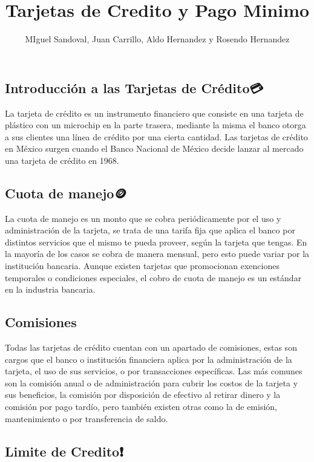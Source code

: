 \documentclass[
  letterpaper,
  DIV=11,
  numbers=noendperiod]{scrartcl}
\title{Tarjetas de Credito y Pago Minimo}
\author{MIguel Sandoval, Juan Carrillo, Aldo Hernandez y Rosendo
Hernandez}
\date{}
\begin{document}
\maketitle


\subsection{Introducción a las Tarjetas de
Crédito💳}\label{introducciuxf3n-a-las-tarjetas-de-cruxe9dito}

La tarjeta de crédito es un instrumento financiero que consiste en una
tarjeta de plástico con un microchip en la parte trasera, mediante la
misma el banco otorga a sus clientes una línea de crédito por una cierta
cantidad. Las tarjetas de crédito en México surgen cuando el Banco
Nacional de México decide lanzar al mercado una tarjeta de crédito en
1968.

\subsection{Cuota de manejo🪙}\label{cuota-de-manejo}

La cuota de manejo es un monto que se cobra periódicamente por el uso y
administración de la tarjeta, se trata de una tarifa fija que aplica el
banco por distintos servicios que el mismo te pueda proveer, según la
tarjeta que tengas. En la mayoría de los casos se cobra de manera
mensual, pero esto puede variar por la institución bancaria. Aunque
existen tarjetas que promocionan exenciones temporales o condiciones
especiales, el cobro de cuota de manejo es un estándar en la industria
bancaria.

\subsection{Comisiones🧾}\label{comisiones}

Todas las tarjetas de crédito cuentan con un apartado de comisiones,
estas son cargos que el banco o institución financiera aplica por la
administración de la tarjeta, el uso de sus servicios, o por
transacciones específicas. Las más comunes son la comisión anual o de
administración para cubrir los costos de la tarjeta y sus beneficios, la
comisión por disposición de efectivo al retirar dinero y la comisión por
pago tardío, pero también existen otras como la de emisión,
mantenimiento o por transferencia de saldo.

\subsection{Limite de Credito❗}\label{limite-de-credito}
\end{document}
